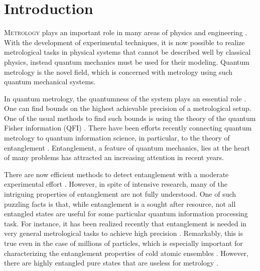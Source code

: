 \section{Introduction}

\label{sec:in}

\lettrine[lines=2, findent=3pt,nindent=0pt]{M}{etrology} plays an important role in many areas of physics and engineering \cite{Glaser2010}.
With the development of experimental techniques, it is now possible to realize metrological tasks in physical systems that cannot be described well by classical physics, instead quantum mechanics must be used for their modeling.
Quantum metrology \cite{Giovannetti2004, Giovannetti2006, Paris2009, Gross2012} is the novel field, which is concerned with metrology using such quantum mechanical systems.

In quantum metrology, the quantumness of the system plays an essential role \cite{Demkowicz-Dobrzanski2015, Pezze2014}.
One can find bounds on the highest achievable precision of a metrological setup.
One of the usual methods to find such bounds is using the theory of the quantum Fisher information (QFI) \cite{Helstrom1969, Holevo1982, Braunstein1996, Petz2008}.
There have been efforts recently connecting quantum metrology to quantum information science, in particular, to the theory of entanglement \cite{Toth2010}.
Entanglement, a feature of quantum mechanics, lies at the heart of many problems has attracted an increasing attention in recent years.

There are now efficient methods to detect entanglement with a moderate experimental effort \cite{Horodecki2009, Guehne2009}.
However, in spite of intensive research, many of the intriguing properties of entanglement are not fully understood.
One of such puzzling facts is that, while entanglement is a sought after resource, not all entangled states are useful for some particular quantum information processing task.
For instance, it has been realized recently that entanglement is needed in very general metrological tasks to achieve high precision \cite{Pezze2009}.
Remarkably, this is true even in the case of millions of particles, which is especially important for characterizing the entanglement properties of cold atomic ensembles \cite{Louchet-Chauvet2010, Appel2009, Riedel2010, Gross2010, Luecke2011, Strobel2014}.
However, there are highly entangled pure states that are useless for metrology \cite{Hyllus2010}.

